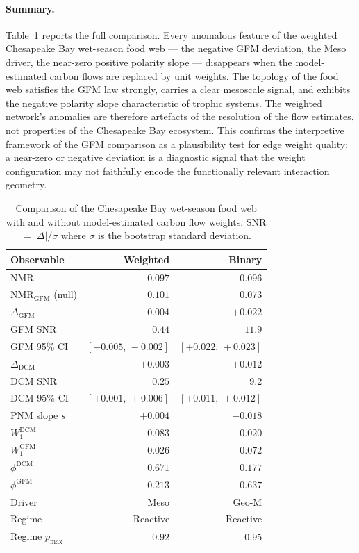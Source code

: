 \documentclass[aps,superscriptaddress,11pt]{revtex4-2}
\theoremstyle{definition}
\theoremstyle{plain}
\begin{document}
\paragraph{Summary.}
Table~\ref{tab:baywet_binary} reports the full comparison.  Every
anomalous feature of the weighted Chesapeake Bay wet-season food web
--- the negative GFM deviation, the Meso driver, the near-zero positive
polarity slope --- disappears when the model-estimated carbon flows are
replaced by unit weights.  The topology of the food web satisfies the GFM
law strongly, carries a clear mesoscale signal, and exhibits the negative
polarity slope characteristic of trophic systems.  The weighted network's
anomalies are therefore artefacts of the resolution of the flow estimates,
not properties of the Chesapeake Bay ecosystem.  This confirms the
interpretive framework of the GFM comparison as a plausibility test for
edge weight quality: a near-zero or negative deviation is a diagnostic
signal that the weight configuration may not faithfully encode the
functionally relevant interaction geometry.

\begin{table}[h]
\centering
\caption{Comparison of the Chesapeake Bay wet-season food web with and
without model-estimated carbon flow weights.  SNR $= |\Delta|/\sigma$
where $\sigma$ is the bootstrap standard deviation.\\
}
\label{tab:baywet_binary}
\small
\begin{tabular}{lrr}
\toprule
Observable & Weighted & Binary \\
\midrule
NMR                          & $0.097$  & $0.096$  \\
NMR$_{\mathrm{GFM}}$ (null) & $0.101$  & $0.073$  \\
$\Delta_{\mathrm{GFM}}$      & $-0.004$ & $+0.022$ \\
GFM SNR                      & $0.44$   & $11.9$   \\
GFM 95\% CI                  & $[-0.005,\,-0.002]$ & $[+0.022,\,+0.023]$ \\
\midrule
$\Delta_{\mathrm{DCM}}$      & $+0.003$ & $+0.012$ \\
DCM SNR                      & $0.25$   & $9.2$    \\
DCM 95\% CI                  & $[+0.001,\,+0.006]$ & $[+0.011,\,+0.012]$ \\
\midrule
PNM slope $s$                & $+0.004$ & $-0.018$ \\
$W_1^{\mathrm{DCM}}$         & $0.083$  & $0.020$  \\
$W_1^{\mathrm{GFM}}$         & $0.026$  & $0.072$  \\
$\phi^{\mathrm{DCM}}$        & $0.671$  & $0.177$  \\
$\phi^{\mathrm{GFM}}$        & $0.213$  & $0.637$  \\
\midrule
Driver                       & Meso     & Geo-M    \\
Regime                       & Reactive & Reactive \\
Regime $p_{\max}$            & $0.92$   & $0.95$   \\
\bottomrule
\end{tabular}
\end{table}
\end{document}
